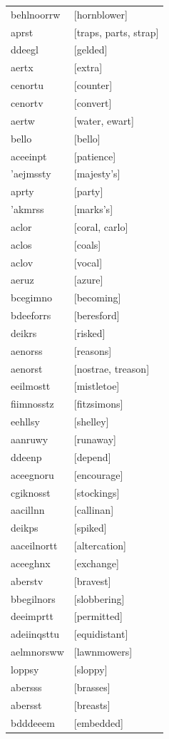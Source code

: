 \documentclass{article}
\begin{document}
\begin{tabular}{ll}
behlnoorrw & [hornblower] \\
aprst & [traps, parts, strap] \\
ddeegl & [gelded] \\
aertx & [extra] \\
cenortu & [counter] \\
cenortv & [convert] \\
aertw & [water, ewart] \\
bello & [bello] \\
aceeinpt & [patience] \\
'aejmssty & [majesty's] \\
aprty & [party] \\
'akmrss & [marks's] \\
aclor & [coral, carlo] \\
aclos & [coals] \\
aclov & [vocal] \\
aeruz & [azure] \\
bcegimno & [becoming] \\
bdeeforrs & [beresford] \\
deikrs & [risked] \\
aenorss & [reasons] \\
aenorst & [nostrae, treason] \\
eeilmostt & [mistletoe] \\
fiimnosstz & [fitzsimons] \\
eehllsy & [shelley] \\
aanruwy & [runaway] \\
ddeenp & [depend] \\
aceegnoru & [encourage] \\
cgiknosst & [stockings] \\
aacillnn & [callinan] \\
deikps & [spiked] \\
aaceilnortt & [altercation] \\
aceeghnx & [exchange] \\
aberstv & [bravest] \\
bbegilnors & [slobbering] \\
deeimprtt & [permitted] \\
adeiinqsttu & [equidistant] \\
aelmnorsww & [lawnmowers] \\
loppsy & [sloppy] \\
abersss & [brasses] \\
abersst & [breasts] \\
bdddeeem & [embedded] \\

\end{tabular}
\end{document}
